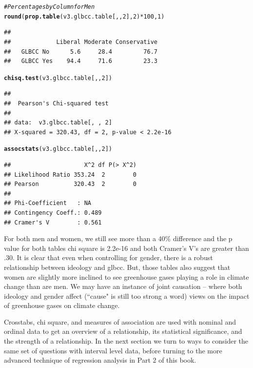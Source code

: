 \documentclass[11pt,openany]{book}\usepackage[]{graphicx}\usepackage[]{color}
\makeatletter
\newcommand{\hlnum}[1]{\textcolor[rgb]{0.686,0.059,0.569}{#1}}%
\newcommand{\hlcom}[1]{\textcolor[rgb]{0.678,0.584,0.686}{\textit{#1}}}%
\newcommand{\hlopt}[1]{\textcolor[rgb]{0,0,0}{#1}}%
\newcommand{\hlstd}[1]{\textcolor[rgb]{0.345,0.345,0.345}{#1}}%
\newcommand{\hlkwd}[1]{\textcolor[rgb]{0.737,0.353,0.396}{\textbf{#1}}}%
\newenvironment{kframe}{%
 \def\at@end@of@kframe{}%
 \ifinner\ifhmode%
  \def\at@end@of@kframe{\end{minipage}}%
  \begin{minipage}{\columnwidth}%
 \fi\fi%
 \def\FrameCommand##1{\hskip\@totalleftmargin \hskip-\fboxsep
 \colorbox{shadecolor}{##1}\hskip-\fboxsep
     \hskip-\linewidth \hskip-\@totalleftmargin \hskip\columnwidth}%
 \MakeFramed {\advance\hsize-\width
   \@totalleftmargin\z@ \linewidth\hsize
   \@setminipage}}%
 {\par\unskip\endMakeFramed%
 \at@end@of@kframe}
\newenvironment{knitrout}{}{} %
\renewenvironment{knitrout}{\begin{singlespace}}{\end{singlespace}}
\makeatother
\begin{document}
\begin{knitrout}
\color{fgcolor}\begin{kframe}
\begin{alltt}
\hlcom{# Percentages by Column for Men}
\hlkwd{round}\hlstd{(}\hlkwd{prop.table}\hlstd{(v3.glbcc.table[, ,} \hlnum{2}\hlstd{],} \hlnum{2}\hlstd{)} \hlopt{*} \hlnum{100}\hlstd{,} \hlnum{1}\hlstd{)}
\end{alltt}
\begin{verbatim}
##            
##             Liberal Moderate Conservative
##   GLBCC No      5.6     28.4         76.7
##   GLBCC Yes    94.4     71.6         23.3
\end{verbatim}
\begin{alltt}
\hlkwd{chisq.test}\hlstd{(v3.glbcc.table[, ,} \hlnum{2}\hlstd{])}
\end{alltt}
\begin{verbatim}
## 
## 	Pearson's Chi-squared test
## 
## data:  v3.glbcc.table[, , 2]
## X-squared = 320.43, df = 2, p-value < 2.2e-16
\end{verbatim}
\begin{alltt}
\hlkwd{assocstats}\hlstd{(v3.glbcc.table[, ,} \hlnum{2}\hlstd{])}
\end{alltt}
\begin{verbatim}
##                     X^2 df P(> X^2)
## Likelihood Ratio 353.24  2        0
## Pearson          320.43  2        0
## 
## Phi-Coefficient   : NA 
## Contingency Coeff.: 0.489 
## Cramer's V        : 0.561
\end{verbatim}
\end{kframe}
\end{knitrout}

For both men and women, we still see more than a 40\% difference and the p value for both tables chi square is 2.2e-16 and both Cramer's V's are greater than .30.  It is clear that even when controlling for gender, there is a robust relationship between ideology and glbcc.  But, those tables also suggest that women are slightly more inclined to see greenhouse gases playing a role in climate change than are men.   We may have an instance of joint causation -- where both ideology and gender affect (``cause" is still too strong a word) views on the impact of greenhouse gases on climate change.

Crosstabs, chi square, and measures of association are used with nominal and ordinal data to get an overview of a relationship, its statistical significance, and the strength of a relationship.  In the next section we turn to ways to consider the same set of questions with interval level data, before turning to the more advanced technique of regression analysis in Part 2 of this book.  
\end{document}
